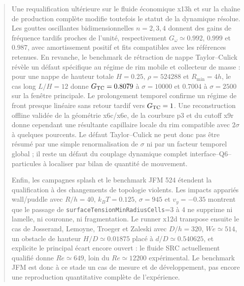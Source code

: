 \documentclass[11pt,a4paper]{article}
\begin{document}
\begin{abstract}
Une requalification ultérieure sur le fluide économique x13h et sur la chaîne de production complète modifie toutefois le statut de la dynamique résolue. Les gouttes oscillantes bidimensionnelles $n=2,3,4$ donnent des gains de fréquence tardifs proches de l'unité, respectivement $G_\omega\simeq0.992$, $0.999$ et $0.987$, avec amortissement positif et fits compatibles avec les références retenues. En revanche, le benchmark de rétraction de nappe Taylor--Culick révèle un défaut spécifique au régime de rim mobile et collecteur de masse : pour une nappe de hauteur totale $H=0.25$, $\rho=524288$ et $R_{\min}=4h$, le cas long $L/H=12$ donne $G_{\rm TC}=0.8079$ à $\sigma=10000$ et $0.7004$ à $\sigma=2500$ sur la fenêtre principale. Le prolongement temporel confirme un régime de front presque linéaire sans retour tardif vers $G_{\rm TC}=1$. Une reconstruction offline validée de la géométrie x6c/x6e, de la courbure p3 et du cutoff x9r donne cependant une résultante capillaire locale du rim compatible avec $2\sigma$ à quelques pourcents. Le défaut Taylor--Culick ne peut donc pas être résumé par une simple renormalisation de $\sigma$ ni par un facteur temporel global ; il reste un défaut du couplage dynamique complet interface--Q6--particules à localiser par bilan de quantité de mouvement.

Enfin, les campagnes splash et le benchmark JFM 524 étendent la qualification à des changements de topologie violents. Les impacts appariés wall/puddle avec $R/h=40$, $k_BT=0.125$, $\sigma=945$ et $v_y=-0.35$ montrent que le passage de \texttt{surfaceTensionMinRadiusCells}=3 à 4 ne supprime ni lamelle, ni couronne, ni fragmentation. Le runner x12d transpose ensuite le cas de Josserand, Lemoyne, Troeger et Zaleski \cite{JosserandLemoyneTroegerZaleski2005} avec $D/h=320$, $We\simeq514$, un obstacle de hauteur $H/D\simeq0.01875$ placé à $d/D\simeq0.540625$, et explicite le principal écart encore ouvert : le fluide SRC actuellement qualifié donne $Re\simeq649$, loin du $Re\simeq12200$ expérimental. Le benchmark JFM est donc à ce stade un cas de mesure et de développement, pas encore une reproduction quantitative complète de l'expérience.





\end{abstract}
\end{document}
